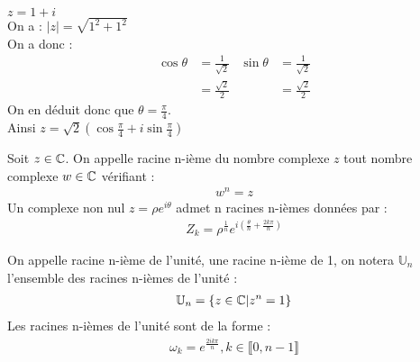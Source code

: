 \begin{exemple}
        $z = 1 + i$
        \\
        On a : $|z| = \sqrt{1^2 + 1^2}$
        \\
        On a donc :
        \begin{align*}
            \cos{\theta} &= \frac{1}{\sqrt{2}} & \sin{\theta} &= \frac{1}{\sqrt{2}} \\
                         &= \frac{\sqrt{2}}{2} &              &= \frac{\sqrt{2}}{2}
        \end{align*}
        On en déduit donc que $\theta = \frac{\pi}{4}$. \\
        Ainsi $z = \sqrt{2}\left(\cos{\frac{\pi}{4}} + i\sin{\frac{\pi}{4}}\right)$
    \end{exemple}



    \begin{definition}
    Soit $z \in \mathbb{C}$. On appelle racine n-ième du nombre complexe $z$ tout nombre complexe $w \in \mathbb{C}$ vérifiant :
    \begin{align*}
        w^n = z 
    \end{align*}
    Un complexe non nul $z = \rho e^{i\theta}$ admet n racines n-ièmes données par :
    \begin{align*}
        Z_k = \rho^{\frac{1}{n}} e^{i\left(\frac{\theta}{n} + \frac{2k\pi}{n} \right)} 
    \end{align*}
\end{definition}

    \begin{definition}
    On appelle racine n-ième de l'unité, une racine n-ième de 1, on notera $\mathbb{U}_n$ l'ensemble des racines n-ièmes de l'unité :
    \begin{align*}
        \mathbb{U}_n = \{z \in \mathbb{C} | z^n = 1 \} 
    \end{align*}
    Les racines n-ièmes de l'unité sont de la forme :
    \begin{align*}
        \omega_k = e^{\frac{2ik\pi}{n}}, k \in \llbracket 0, n - 1 \rrbracket 
    \end{align*}
\end{definition}

